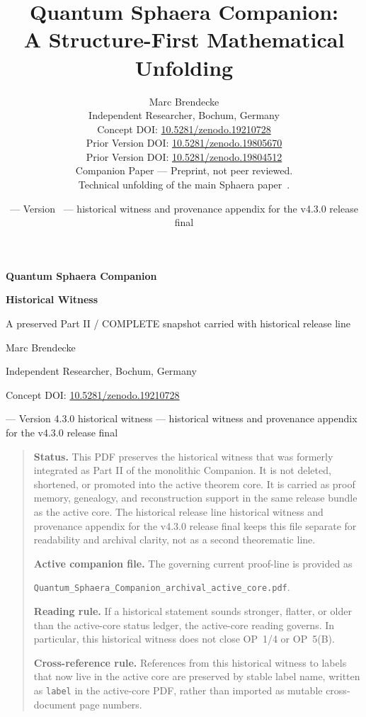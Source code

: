 \documentclass[12pt,a4paper]{article}
\title{%
 Quantum Sphaera Companion:\\
 A Structure-First Mathematical Unfolding
}
\author{%
 Marc Brendecke\\
 \small Independent Researcher, Bochum, Germany\\
 \small Concept DOI: \href{https://doi.org/10.5281/zenodo.19210728}{10.5281/zenodo.19210728}\\
 \small Prior Version DOI: \href{https://doi.org/10.5281/zenodo.19805670}{10.5281/zenodo.19805670}\\
 \small Prior Version DOI: \href{https://doi.org/10.5281/zenodo.19804512}{10.5281/zenodo.19804512}\\
 \small Companion Paper --- Preprint, not peer reviewed.\\
 \small Technical unfolding of the main Sphaera paper~\cite{brendecke2026main}.
}
\date{\docdate{} --- Version \docversion\ --- historical witness and provenance appendix for the v4.3.0 release final}
\DeclareRobustCommand{\QSCver}[1]{archival stage}
\newcommand{\docversion}{4.3.0 historical witness}
\newcommand{\docdate}{\DTMdisplaydate{2026}{04}{27}{-1}}
\renewcommand{\QSCver}[1]{historical release line}
\begin{document}
\begin{center}
{\LARGE\bfseries Quantum Sphaera Companion}\par\vspace{0.4em}
{\Large\bfseries Historical Witness}\par\vspace{0.8em}
{\large A preserved Part II / COMPLETE snapshot carried with \QSCver{shifted.0.13}}\par\vspace{0.8em}
Marc Brendecke\par
Independent Researcher, Bochum, Germany\par
Concept DOI: \href{https://doi.org/10.5281/zenodo.19210728}{10.5281/zenodo.19210728}\par
\docdate{} --- Version \docversion{} --- historical witness and provenance appendix for the v4.3.0 release final
\end{center}
\thispagestyle{fancy}

\begin{quote}\small
\noindent\textbf{Status.} This PDF preserves the historical witness that was formerly integrated as Part II of the monolithic Companion. It is not deleted, shortened, or promoted into the active theorem core. It is carried as proof memory, genealogy, and reconstruction support in the same release bundle as the active core. The \QSCver{legacy.35.0} historical witness and provenance appendix for the v4.3.0 release final keeps this file separate for readability and archival clarity, not as a second theorematic line.

\medskip
\noindent\textbf{Active companion file.} The governing current proof-line is provided as\par
\texttt{Quantum\_Sphaera\_Companion\_archival\_active\_core.pdf}.

\medskip
\noindent\textbf{Reading rule.} If a historical statement sounds stronger, flatter, or older than the active-core status ledger, the active-core reading governs. In particular, this historical witness does not close OP~1/4 or OP~5(B).

\medskip
\noindent\textbf{Cross-reference rule.} References from this historical witness to labels that now live in the active core are preserved by stable label name, written as \texttt{label} in the active-core PDF, rather than imported as mutable cross-document page numbers.
\end{quote}

\clearpage
\tableofcontents
\end{document}
